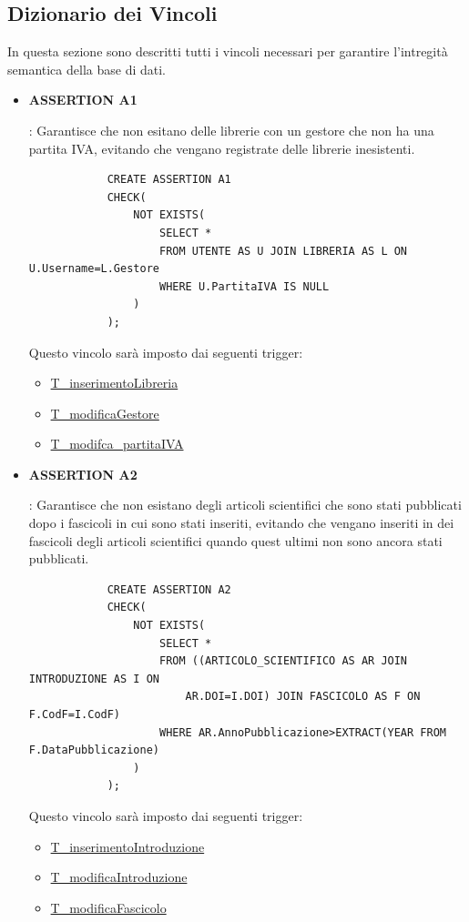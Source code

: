 \documentclass{article}
\begin{document}
\subsection{Dizionario dei Vincoli}
In questa sezione sono descritti tutti i vincoli necessari per garantire l'intregità semantica della base di dati.

\begin{itemize} 
    \item  \hypertarget{assertion1}{\textbf{ASSERTION A1}}: Garantisce che non esitano delle librerie con un gestore che non ha una partita IVA, evitando che vengano registrate delle librerie inesistenti.
        \begin{verbatim}
            CREATE ASSERTION A1
            CHECK(
                NOT EXISTS(
                    SELECT *
                    FROM UTENTE AS U JOIN LIBRERIA AS L ON U.Username=L.Gestore
                    WHERE U.PartitaIVA IS NULL
                )
            );
        \end{verbatim}
    Questo vincolo sarà imposto dai seguenti trigger:
        \begin{itemize}
            \item \hyperlink{t1}{T\_inserimentoLibreria}
            \item \hyperlink{t2}{T\_modificaGestore}
            \item \hyperlink{t3}{T\_modifca\_partitaIVA}
        \end{itemize}

    \item \hypertarget{assertion2}{\textbf{ASSERTION A2}}: Garantisce che non esistano degli articoli scientifici che sono stati pubblicati dopo i fascicoli in cui sono stati inseriti, evitando che vengano inseriti in dei fascicoli degli articoli scientifici quando quest ultimi non sono ancora stati pubblicati.
        \begin{verbatim}
            CREATE ASSERTION A2
            CHECK(
                NOT EXISTS(
                    SELECT *
                    FROM ((ARTICOLO_SCIENTIFICO AS AR JOIN INTRODUZIONE AS I ON
                        AR.DOI=I.DOI) JOIN FASCICOLO AS F ON F.CodF=I.CodF) 
                    WHERE AR.AnnoPubblicazione>EXTRACT(YEAR FROM F.DataPubblicazione)  
                )
            );
        \end{verbatim}
    Questo vincolo sarà imposto dai seguenti trigger:
        \begin{itemize}
            \item \hyperlink{t4}{T\_inserimentoIntroduzione}
            \item \hyperlink{t5}{T\_modificaIntroduzione}
            \item \hyperlink{t6}{T\_modificaFascicolo}
        \end{itemize}


\end{itemize}
\end{document}
